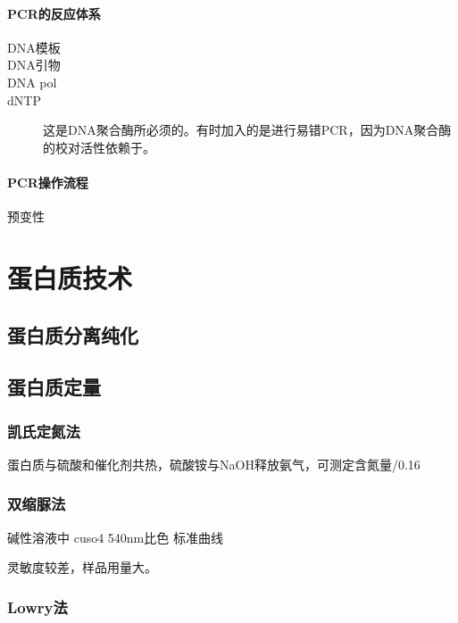 \paragraph{PCR的反应体系}

\begin{description}
	\item[DNA模板]
	\item[DNA引物]
	\item[DNA pol]
	\item[dNTP]
	\item[] 这是DNA聚合酶所必须的。有时加入的是进行易错PCR，因为DNA聚合酶的校对活性依赖于。
\end{description}

\paragraph{PCR操作流程}

预变性




\section{蛋白质技术}

\subsection{蛋白质分离纯化}

\subsection{蛋白质定量}

\subsubsection{凯氏定氮法}

蛋白质与硫酸和催化剂共热，硫酸铵与NaOH释放氨气，可测定含氮量/0.16

\subsubsection{双缩脲法}

碱性溶液中 cuso4 540nm比色 标准曲线

灵敏度较差，样品用量大。

\subsubsection{Lowry法}

